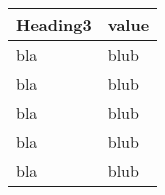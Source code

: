 \begin{tabular}[t]{ll}
Heading3 & value \\
\midrule
bla & blub \\
bla & blub \\
bla & blub \\
bla & blub \\
bla & blub \\
\end{tabular}